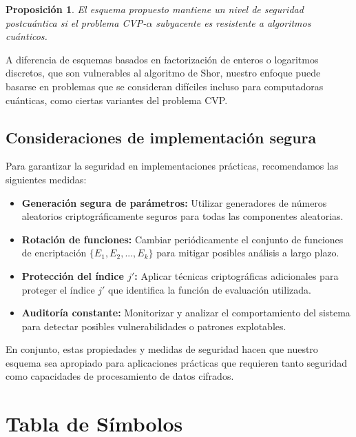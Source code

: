 \documentclass[11pt]{article}
\theoremstyle{plain}
\newtheorem{proposition}[theorem]{Proposición}
\begin{document}
\begin{proposition}
El esquema propuesto mantiene un nivel de seguridad postcuántica si el problema CVP-$\alpha$ subyacente es resistente a algoritmos cuánticos.
\end{proposition}

A diferencia de esquemas basados en factorización de enteros o logaritmos discretos, que son vulnerables al algoritmo de Shor, nuestro enfoque puede basarse en problemas que se consideran difíciles incluso para computadoras cuánticas, como ciertas variantes del problema CVP.

\subsection{Consideraciones de implementación segura}

Para garantizar la seguridad en implementaciones prácticas, recomendamos las siguientes medidas:

\begin{itemize}
    \item \textbf{Generación segura de parámetros:} Utilizar generadores de números aleatorios criptográficamente seguros para todas las componentes aleatorias.
    \item \textbf{Rotación de funciones:} Cambiar periódicamente el conjunto de funciones de encriptación $\{E_1, E_2, ..., E_k\}$ para mitigar posibles análisis a largo plazo.
    \item \textbf{Protección del índice $j'$:} Aplicar técnicas criptográficas adicionales para proteger el índice $j'$ que identifica la función de evaluación utilizada.
    \item \textbf{Auditoría constante:} Monitorizar y analizar el comportamiento del sistema para detectar posibles vulnerabilidades o patrones explotables.
\end{itemize}

En conjunto, estas propiedades y medidas de seguridad hacen que nuestro esquema sea apropiado para aplicaciones prácticas que requieren tanto seguridad como capacidades de procesamiento de datos cifrados.

\section{Tabla de Símbolos}
\end{document}
